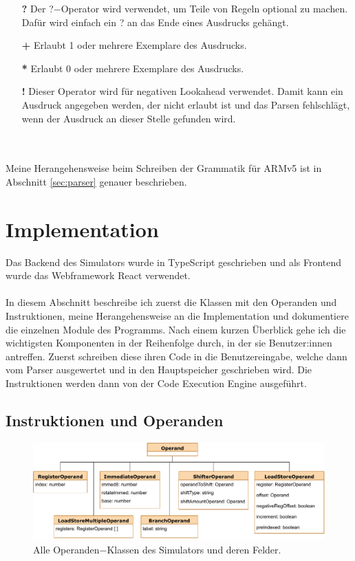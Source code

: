 \documentclass[a4paper, 11pt, onecolumn]{article}
\begin{document}
\begin{itemize}[labelwidth=2em,leftmargin =\dimexpr{}+\relax, align=parleft]
\item[{\textbf{?}}] Der ?$-$Operator wird verwendet, um Teile von Regeln optional zu machen. Dafür wird einfach ein ? an das Ende eines Ausdrucks gehängt.
\item[{\textbf{+}}] Erlaubt 1 oder mehrere Exemplare des Ausdrucks.
\item[{\textbf{*}}] Erlaubt 0 oder mehrere Exemplare des Ausdrucks.
\item[{\textbf{!}}] Dieser Operator wird für negativen Lookahead verwendet. Damit kann ein Ausdruck angegeben werden, der nicht erlaubt ist und das Parsen fehlschlägt, wenn der Ausdruck an dieser Stelle gefunden wird.
\end{itemize}
~\\ \\ \noindent
Meine Herangehensweise beim Schreiben der Grammatik für ARMv5 ist in Abschnitt \ref{sec:parser} genauer beschrieben.

\newpage
\section{Implementation}\label{sec:implementation}

Das Backend des Simulators wurde in TypeScript \cite{typescript}\cite{understandingtypescript} geschrieben und als Frontend wurde das Webframework React \cite{react} verwendet.\\ \\
In diesem Abschnitt beschreibe ich zuerst die Klassen mit den Operanden und Instruktionen, meine Herangehensweise an die Implementation und dokumentiere die einzelnen Module des Programms. Nach einem kurzen Überblick gehe ich die wichtigsten Komponenten in der Reihenfolge durch, in der sie Benutzer:innen antreffen. Zuerst schreiben diese ihren Code in die Benutzereingabe, welche dann vom Parser ausgewertet und in den Hauptspeicher geschrieben wird. Die Instruktionen werden dann von der Code Execution Engine ausgeführt.

\subsection{Instruktionen und Operanden}\label{sec:instAndOps}

\begin{figure}[!htb]
\centering
\includegraphics[width=1\textwidth]{data/operands}
\caption{Alle Operanden$-$Klassen des Simulators und deren Felder.}
\label{fig:operands}
\end{figure}
\end{document}
